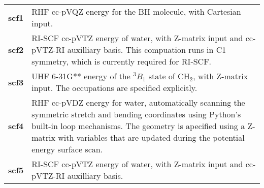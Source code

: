\begin{tabular*}{\textwidth}[tb]{p{}p{}}
{\bf scf1} &  RHF cc-pVQZ energy for the BH molecule, with Cartesian input.\\
{\bf scf2} &  RI-SCF cc-pVTZ energy of water, with Z-matrix input and cc-pVTZ-RI auxilliary basis. This compuation runs in C1 symmetry, which is currently required for RI-SCF.\\
{\bf scf3} &  UHF 6-31G** energy of the $^3B_1$ state of CH$_2$, with Z-matrix input. The occupations are specified explicitly.\\
{\bf scf4} &  RHF cc-pVDZ energy for water, automatically scanning the symmetric stretch and bending coordinates using Python's built-in loop mechanisms.  The geometry is apecified using a Z-matrix with variables that are updated during the potential energy surface scan.\\
{\bf scf5} &  RI-SCF cc-pVTZ energy of water, with Z-matrix input and cc-pVTZ-RI auxilliary basis.\\
\end{tabular*}